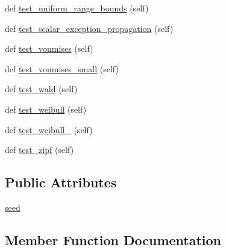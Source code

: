 \begin{DoxyCompactItemize}
\item 
def \hyperlink{classnumpy_1_1random_1_1tests_1_1test__random_1_1TestRandomDist_a83b4763accd686bbf4ccca454554e30e}{test\+\_\+uniform\+\_\+range\+\_\+bounds} (self)
\item 
def \hyperlink{classnumpy_1_1random_1_1tests_1_1test__random_1_1TestRandomDist_a654d6c6eea0c4de2ffd9c9a0fc20abc9}{test\+\_\+scalar\+\_\+exception\+\_\+propagation} (self)
\item 
def \hyperlink{classnumpy_1_1random_1_1tests_1_1test__random_1_1TestRandomDist_a7b52c11aaaff435aabdf79f76635d6f7}{test\+\_\+vonmises} (self)
\item 
def \hyperlink{classnumpy_1_1random_1_1tests_1_1test__random_1_1TestRandomDist_abd6f8b07fd2186363fc70397960acf26}{test\+\_\+vonmises\+\_\+small} (self)
\item 
def \hyperlink{classnumpy_1_1random_1_1tests_1_1test__random_1_1TestRandomDist_a2344a2baebfeb5b00b8e4d2c6238a162}{test\+\_\+wald} (self)
\item 
def \hyperlink{classnumpy_1_1random_1_1tests_1_1test__random_1_1TestRandomDist_a5b221d03060eded81b1ce08f016d3f44}{test\+\_\+weibull} (self)
\item 
def \hyperlink{classnumpy_1_1random_1_1tests_1_1test__random_1_1TestRandomDist_aa5bc280bed9d67fdb0731ea22f64b36a}{test\+\_\+weibull\+\_} (self)
\item 
def \hyperlink{classnumpy_1_1random_1_1tests_1_1test__random_1_1TestRandomDist_a6a083dfdfe1a93ea64baa7a0d489578d}{test\+\_\+zipf} (self)
\end{DoxyCompactItemize}
\subsection*{Public Attributes}
\begin{DoxyCompactItemize}
\item 
\hyperlink{classnumpy_1_1random_1_1tests_1_1test__random_1_1TestRandomDist_aeba8dc06ea0197834e910c272f0f8cbe}{seed}
\end{DoxyCompactItemize}


\subsection{Member Function Documentation}
\mbox{\label{classnumpy_1_1random_1_1tests_1_1test__random_1_1TestRandomDist_a532c47caea1d09de86f99cde56f025dc}} 
